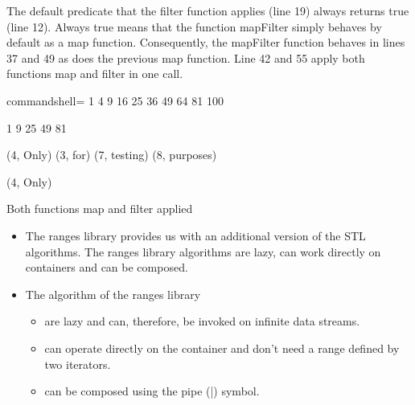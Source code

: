 The default predicate that the filter function applies (line 19) always returns true (line 12). Always true means that the function mapFilter simply behaves by default as a map function. Consequently, the mapFilter function behaves in lines 37 and 49 as does the previous map function. Line 42 and 55 apply both functions map and filter in one call.

\begin{tcblisting}{commandshell={}}
1 4 9 16 25 36 49 64 81 100
	
1 9 25 49 81

(4, Only) (3, for) (7, testing) (8, purposes)

(4, Only)
\end{tcblisting}

\begin{center}
Both functions map and filter applied
\end{center}

\begin{tcolorbox}[breakable,enhanced jigsaw,colback=mygreen!5!white,colframe=mygreen!75!black,title={Distilled Information}]
\begin{itemize}
\item 
The ranges library provides us with an additional version of the STL algorithms. The ranges library algorithms are lazy, can work directly on containers and can be composed.

\item 
The algorithm of the ranges library
\begin{itemize}
\item 
are lazy and can, therefore, be invoked on infinite data streams.

\item 
can operate directly on the container and don’t need a range defined by two iterators.

\item 
can be composed using the pipe (|) symbol.
\end{itemize}
\end{itemize}
\end{tcolorbox}	
	
\newpage
	
	
	
	
	
	
	
	
	
	
	
	
	
	
	
	
	
	
	
	
	